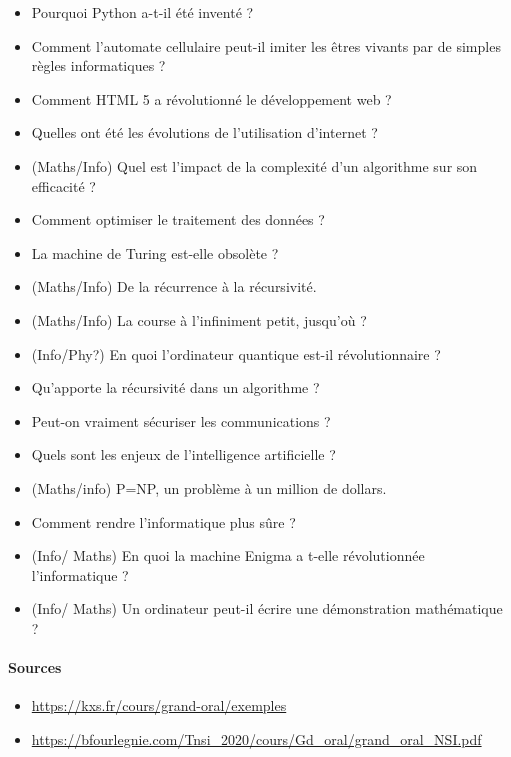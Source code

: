 \documentclass[
  a4paper,
  DIV=11,
  numbers=noendperiod]{scrartcl}
\let\oldparagraph\paragraph
\renewcommand{\paragraph}[1]{\oldparagraph{#1}\mbox{}}
\providecommand{\tightlist}{%
  \setlength{\itemsep}{0pt}\setlength{\parskip}{0pt}}\usepackage{longtable,booktabs,array}
\begin{document}
\begin{itemize}
\item
  Pourquoi Python a-t-il été inventé ?
\item
  Comment l'automate cellulaire peut-il imiter les êtres vivants par de
  simples règles informatiques ?
\item
  Comment HTML 5 a révolutionné le développement web ?
\item
  Quelles ont été les évolutions de l'utilisation d'internet ?
\item
  (Maths/Info) Quel est l'impact de la complexité d'un algorithme sur
  son efficacité ?
\item
  Comment optimiser le traitement des données ?
\item
  La machine de Turing est-elle obsolète ?
\item
  (Maths/Info) De la récurrence à la récursivité.
\item
  (Maths/Info) La course à l'infiniment petit, jusqu'où ?
\item
  (Info/Phy?) En quoi l'ordinateur quantique est-il révolutionnaire ?
\item
  Qu'apporte la récursivité dans un algorithme ?
\item
  Peut-on vraiment sécuriser les communications ?
\item
  Quels sont les enjeux de l'intelligence artificielle ?
\item
  (Maths/info) P=NP, un problème à un million de dollars.
\item
  Comment rendre l'informatique plus sûre ?
\item
  (Info/ Maths) En quoi la machine Enigma a t-elle révolutionnée
  l'informatique ?
\item
  (Info/ Maths) Un ordinateur peut-il écrire une démonstration
  mathématique ?
\end{itemize}

\hypertarget{sources}{%
\paragraph{Sources}\label{sources}}

\begin{itemize}
\tightlist
\item
  \url{https://kxs.fr/cours/grand-oral/exemples}
\item
  \url{https://bfourlegnie.com/Tnsi_2020/cours/Gd_oral/grand_oral_NSI.pdf}
\end{itemize}
\end{document}
